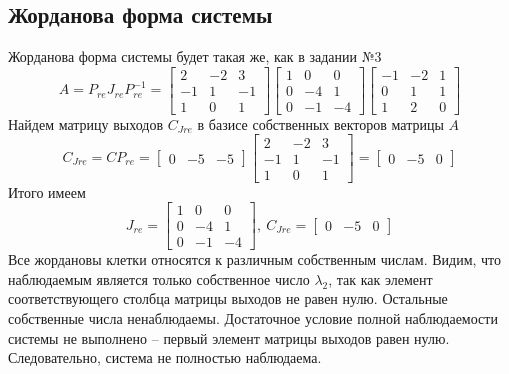 \documentclass[a4paper, 12pt]{article}
\begin{document}
    \subsection{Жорданова форма системы}
    Жорданова форма системы будет такая же, как в задании №3
    $$
    A=P_{re}J_{re}P_{re}^{-1}=\begin{bmatrix}
        2    &-2     &3\\
        -1     &1    &-1\\
         1     &0     &1
        \end{bmatrix}\begin{bmatrix}
        1     &0     &0\\
        0    &-4     &1\\
        0    &-1    &-4
        \end{bmatrix}\begin{bmatrix}
        -1    &-2     &1\\
        0     &1     &1\\
        1     &2     &0
        \end{bmatrix}
    $$
    Найдем матрицу выходов $C_{Jre}$ в базисе собственных векторов матрицы $A$
    $$C_{Jre}=CP_{re}=\begin{bmatrix}
        0 &-5 &-5
    \end{bmatrix}\begin{bmatrix}
        2    &-2     &3\\
        -1     &1    &-1\\
         1     &0     &1
    \end{bmatrix}=\begin{bmatrix}
    0	&-5	&0
    \end{bmatrix}$$
    Итого имеем
    $$
    J_{re}=\begin{bmatrix}
        1     &0     &0\\
        0    &-4     &1\\
        0    &-1    &-4
    \end{bmatrix},\ C_{Jre}=\begin{bmatrix}
        0	&-5	&0
    \end{bmatrix}
    $$
    Все жордановы клетки относятся к различным собственным числам. Видим, что наблюдаемым является
    только собственное число $\lambda_2$, так как элемент соответствующего столбца матрицы выходов не равен нулю.
    Остальные собственные числа ненаблюдаемы. Достаточное условие полной наблюдаемости системы не выполнено --
    первый элемент матрицы выходов равен нулю. Следовательно, система не полностью наблюдаема.
\end{document}
